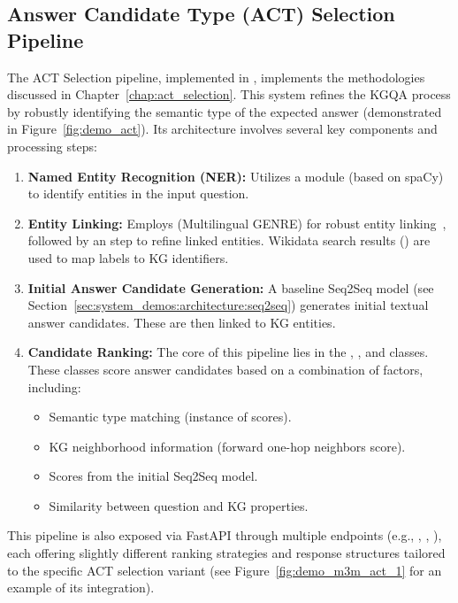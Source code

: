 \subsection{Answer Candidate Type (ACT) Selection Pipeline}
The ACT Selection pipeline, implemented in , implements the methodologies discussed in Chapter~\ref{chap:act_selection}. This system refines the KGQA process by robustly identifying the semantic type of the expected answer (demonstrated in Figure~\ref{fig:demo_act}). Its architecture involves several key components and processing steps:
\begin{enumerate}
    \item \textbf{Named Entity Recognition (NER):} Utilizes a  module (based on spaCy) to identify entities in the input question.
    \item \textbf{Entity Linking:} Employs  (Multilingual GENRE) for robust entity linking~\cite{decao2021multilingual}, followed by an  step to refine linked entities. Wikidata search results () are used to map labels to KG identifiers.
    \item \textbf{Initial Answer Candidate Generation:} A baseline Seq2Seq model (see Section~\ref{sec:system_demos:architecture:seq2seq}) generates initial textual answer candidates. These are then linked to KG entities.
    \item \textbf{Candidate Ranking:} The core of this pipeline lies in the , , and  classes. These classes score answer candidates based on a combination of factors, including:
    \begin{itemize}
        \item Semantic type matching (instance of scores).
        \item KG neighborhood information (forward one-hop neighbors score).
        \item Scores from the initial Seq2Seq model.
        \item Similarity between question and KG properties.
    \end{itemize}
\end{enumerate}
This pipeline is also exposed via FastAPI through multiple endpoints (e.g., , , ), each offering slightly different ranking strategies and response structures tailored to the specific ACT selection variant (see Figure~\ref{fig:demo_m3m_act_1} for an example of its integration).  

